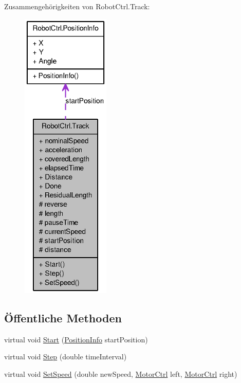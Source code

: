 Zusammengehörigkeiten von RobotCtrl.Track:\nopagebreak
\begin{figure}[H]
\begin{center}
\leavevmode
\includegraphics[height=400pt]{class_robot_ctrl_1_1_track__coll__graph}
\end{center}
\end{figure}
\subsection*{Öffentliche Methoden}
\begin{DoxyCompactItemize}
\item 
virtual void \hyperlink{class_robot_ctrl_1_1_track_a91c0b372e1c332ae1aa18368df116633}{Start} (\hyperlink{struct_robot_ctrl_1_1_position_info}{PositionInfo} startPosition)
\item 
virtual void \hyperlink{class_robot_ctrl_1_1_track_a82386b9a49faa6a31d9706f39238f21b}{Step} (double timeInterval)
\item 
virtual void \hyperlink{class_robot_ctrl_1_1_track_a9abc3ccf4bf1d9db8d461f2cb4b4b0d3}{SetSpeed} (double newSpeed, \hyperlink{class_robot_ctrl_1_1_motor_ctrl}{MotorCtrl} left, \hyperlink{class_robot_ctrl_1_1_motor_ctrl}{MotorCtrl} right)
\end{DoxyCompactItemize}
